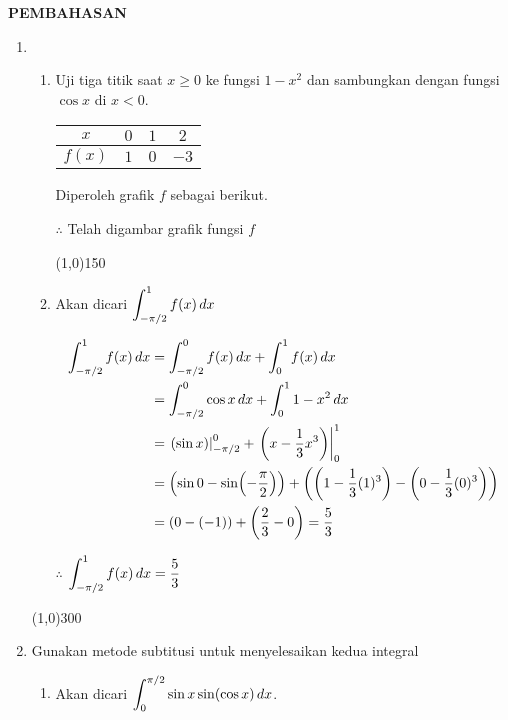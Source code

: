 \begin{center}
\textbf{\large{PEMBAHASAN}}
\end{center}
\begin{enumerate}[leftmargin=*, label={\arabic*}.]
\item 
    \begin{enumerate}[label={\alph*}.]
    \item Uji tiga titik saat $x\geq 0$ ke fungsi $1-x^{2}$ dan sambungkan dengan 
    fungsi $\cos x$ di $x < 0$.
    \begin{center}
        \begin{tabular}{|c|c|c|c|}\hline
            $x$ & $0$ & $1$ & $2$ \\ \hline
            $f(x)$ & $1$ & $0$ & $-3$ \\ \hline
        \end{tabular}
    \end{center}
    Diperoleh grafik $f$ sebagai berikut.

    
    
    $\therefore$ Telah digambar grafik fungsi $f$


\begin{center}\line(1,0){150}\end{center}


    \item Akan dicari $\displaystyle \int_{-\pi/2}^{1}f(x)\,dx$

    \begin{align*}
        \int_{-\pi/2}^{1}f(x)\,dx &=\int_{-\pi/2}^{0} f(x)\,dx + \int_{0}^{1} f(x)\,dx\\
        &=\int_{-\pi/2}^{0} \cos x\,dx + \int_{0}^{1} 1-x^{2}\,dx\\
        &=\eval{\sin x}{-\pi/2}{0} + \eval{x-\frac{1}{3}x^3}{0}{1}\\
        &=\brk*{\sin 0 - \sin\brk*{-\frac{\pi}{2}}}
        +\brk*{\brk*{1-\frac{1}{3}(1)^3}-\brk*{0-\frac{1}{3}(0)^3}}\\
        &=(0-(-1))+\brk*{\frac{2}{3}-0} = \frac{5}{3}
    \end{align*}
    
    $\therefore$ $\displaystyle \int_{-\pi/2}^{1}f(x)\,dx =\frac{5}{3}$

    \end{enumerate}

\begin{center}\line(1,0){300}\end{center}


\item Gunakan metode subtitusi untuk menyelesaikan kedua integral
    \begin{enumerate}[label={\alph*}.]
    \item Akan dicari $\displaystyle \int_{0}^{\pi/2} \sin x\sin(\cos x)\,dx$.
    

\end{enumerate}
\end{enumerate}
